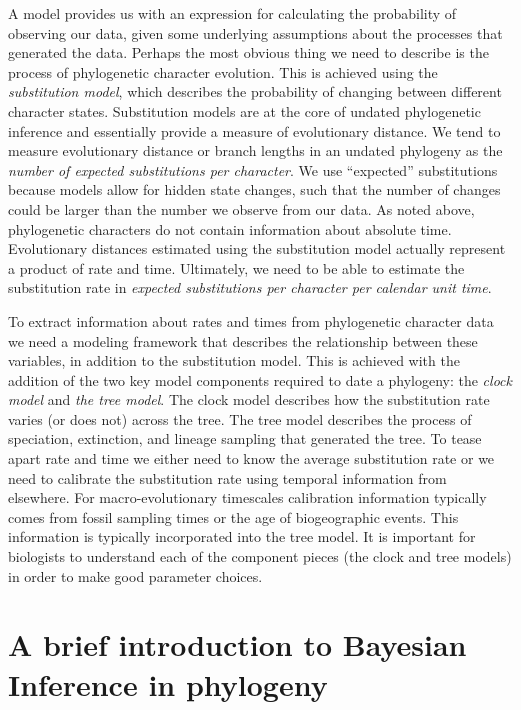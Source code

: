 \documentclass[11pt]{article}
\begin{document}
A model provides us with an expression for calculating the probability of observing our data, given some underlying assumptions about the processes that generated the data. 
Perhaps the most obvious thing we need to describe is the process of phylogenetic character evolution.
This is achieved using the \textit{substitution model}, which describes the probability of changing between different character states.
Substitution models are at the core of undated phylogenetic inference and essentially provide a measure of evolutionary distance.
We tend to measure evolutionary distance or branch lengths in an undated phylogeny as the \textit{number of expected substitutions per character}. We use ``expected'' substitutions because models allow for hidden state changes, such that the number of changes could be larger than the number we observe from our data.
As noted above, phylogenetic characters do not contain information about absolute time. Evolutionary distances estimated using the substitution model actually represent a product of rate and time.
Ultimately, we need to be able to estimate the substitution rate in \textit{expected substitutions per character per calendar unit time}.

To extract information about rates and times from phylogenetic character data we need a modeling framework that describes the  relationship between these variables, in addition to the substitution model.
This is achieved with the addition of the two key model components required to date a phylogeny: the \textit{clock model} and \textit{the tree model}.
The clock model describes how the substitution rate varies (or does not) across the tree.
The tree model describes the process of speciation, extinction, and lineage sampling that generated the tree.
To tease apart rate and time we either need to know the average substitution rate or we need to calibrate the substitution rate using temporal information from elsewhere.
For macro-evolutionary timescales calibration information typically comes from fossil sampling times or the age of biogeographic events. This information is typically incorporated into the tree model.
It is important for biologists to understand each of the component pieces (the clock and tree models) in order to make good parameter choices.

\section{A brief introduction to Bayesian Inference in phylogeny}
\end{document}
